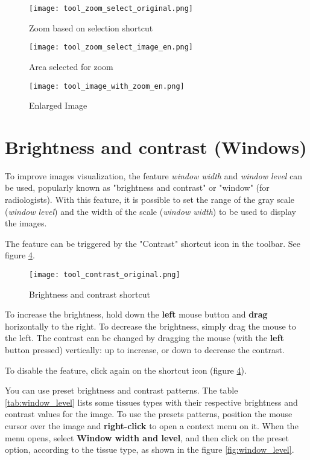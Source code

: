 \begin{figure}[!htb]
\centering
\texttt{[image: tool\_zoom\_select\_original.png]}
\caption{Zoom based on selection shortcut}
\label{fig:zoom_icon_loc}
\end{figure}

\begin{figure}[!htb]
\centering
\texttt{[image: tool\_zoom\_select\_image\_en.png]}
\caption{Area selected for zoom}
\label{fig:zoom_select}
\end{figure}

\begin{figure}[!htb]
\centering
\texttt{[image: tool\_image\_with\_zoom\_en.png]}
\caption{Enlarged Image}
\label{fig:zoom_applied}
\end{figure}


\section{Brightness and contrast (Windows)}
\label{sec:ww_wl}

To improve images visualization, the feature \textit{window width} and \textit{window level} can be used, popularly known as "brightness and contrast" or "window" (for radiologists). With this feature, it is possible to set the range of the gray scale (\textit{window level}) and the width of the scale (\textit{window width}) to be used to display the images.

The feature can be triggered by the "Contrast" shortcut icon in the toolbar. See figure \ref{fig:window_level_shortcut}.

\begin{figure}[!htb]
\centering
\texttt{[image: tool\_contrast\_original.png]}
\caption{Brightness and contrast shortcut}
\label{fig:window_level_shortcut}
\end{figure}

To increase the brightness, hold down the \textbf{left} mouse button and \textbf{drag} horizontally to the right. To decrease the brightness, simply drag the mouse to the left. The contrast can be changed by dragging the mouse (with the \textbf{left} button pressed) vertically: up to increase, or down to decrease the contrast.

To disable the feature, click again on the shortcut icon (figure \ref{fig:window_level_shortcut}).

You can use preset brightness and contrast patterns. The table \ref{tab:window_level} lists some tissues types with their respective brightness and contrast values for the image. To use the presets patterns, position the mouse cursor over the image and \textbf{right-click} to open a context menu on it. When the menu opens, select \textbf{Window width and level}, and then click on the preset option, according to the tissue type, as shown in the figure \ref{fig:window_level}.

